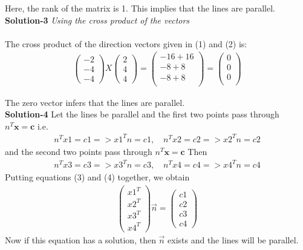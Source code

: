 \documentclass[a4paper,12pt]{article}
\newcommand{\myvec}[1]{\ensuremath{\begin{pmatrix}#1\end{pmatrix}}}
\begin{document}
\begin{flushleft}
Here, the rank of the matrix is 1. This implies that the lines are parallel.\\
\vspace{5mm}
\textbf{Solution-3} \textit{Using the cross product of the vectors}\\
\\
The cross product of the direction vectors given in (1) and (2) is: 
\begin{align*}
\begin{pmatrix} -2\\ -4\\ -4 \end{pmatrix} X
\begin{pmatrix}  2\\  4\\  4 \end{pmatrix} =
\begin{pmatrix}
 -16 + 16 \\
 -8+8 \\
 -8+8\\
\end{pmatrix}
=
\begin{pmatrix}
0 \\
0 \\
0\\
\end{pmatrix}
\end{align*}

The zero vector infers that the lines are parallel.\\
\vspace{5mm}
\textbf{Solution-4} 
Let the lines be parallel and the first two points pass through $n^T\textbf{x} = \textbf{c}$
i.e.
\begin{align}
n^Tx1=c1 => x1^Tn = c1, \quad
n^Tx2=c2 => x2^Tn = c2
\end{align}
and the second two points pass through $n^T\textbf{x} = \textbf{c}$
Then
\begin{align}
n^Tx3=c3 => x3^Tn = c3, \quad
n^Tx4=c4 => x4^Tn = c4
\end{align}
Putting equations (3) and (4) together, we obtain
\begin{align}
\myvec{x1^T\\x2^T\\x3^T\\x4^T}\vec{n} = \myvec{c1\\c2\\c3\\c4}
\end{align}
Now if this equation has a solution, then $\vec{n}$ exists and the lines will be parallel.
\end{flushleft}
\end{document}
